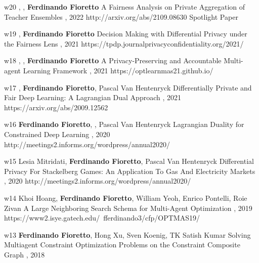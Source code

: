 \begin{pubs}
	\wsentryAwd
	{w20} %
	{, , {\bf Ferdinando Fioretto}}
	{A Fairness Analysis on Private Aggregation of Teacher Ensembles}
	{, 2022}
	{http://arxiv.org/abs/2109.08630}
	{Spotlight Paper}
	
	\wsentry
	{w19} %
	{, {\bf Ferdinando Fioretto}}
	{Decision Making with Differential Privacy under the Fairness Lens}
	{, 2021}
	{https://tpdp.journalprivacyconfidentiality.org/2021/}
 	
	\wsentry
	{w18} %
	{, , {\bf Ferdinando Fioretto}}
	{A Privacy-Preserving and Accountable Multi-agent Learning Framework}
	{, 2021}
	{https://optlearnmas21.github.io/}

	\wsentry
	{w17} %
	{, {\bf Ferdinando Fioretto}, Pascal Van 	Hentenryck}
	{Differentially Private and Fair Deep Learning: A Lagrangian Dual Approach}
	{, 2021}
	{https://arxiv.org/abs/2009.12562}

\wsentry 
	{w16} %
	{{\bf Ferdinando Fioretto}, , Pascal Van Hentenryck}
	{Lagrangian Duality for Constrained Deep Learning}
	{, 2020}
	{http://meetings2.informs.org/wordpress/annual2020/}

\wsentry 
	{w15} %
	{Lesia Mitridati, {\bf Ferdinando Fioretto}, Pascal Van Hentenryck}
	{Differential Privacy For Stackelberg Games: An Application To Gas And Electricity Markets}
	{, 2020}
	{http://meetings2.informs.org/wordpress/annual2020/}


\wsentry 
	{w14} %
	{Khoi Hoang, {\bf Ferdinando Fioretto}, William Yeoh, Enrico Pontelli, Roie Zivan}
	{A Large Neighboring Search Schema for Multi-Agent Optimization} 
	{, 2019}
	{https://www2.isye.gatech.edu/~fferdinando3/cfp/OPTMAS19/}

\wsentry
	{w13} %
	{{\bf Ferdinando Fioretto}, Hong Xu, Sven Koenig, TK Satish Kumar}
	{Solving Multiagent Constraint Optimization Problems on the Constraint Composite Graph} 
	{, 2018}
	{~}


\end{pubs}
